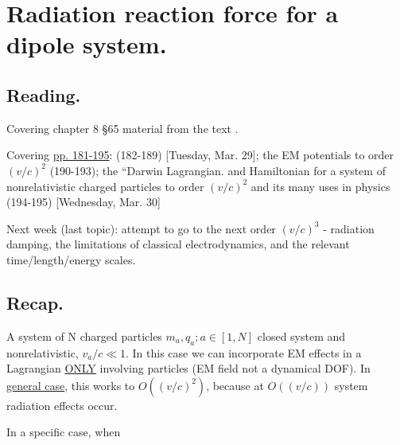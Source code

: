 %
%

\chapter{Radiation reaction force for a dipole system.}
\label{chap:relativisticElectrodynamicsL26}
{}
\date{April 5, 2011}

\beginArtNoToc

\section{Reading.}

Covering chapter 8 \S 65 material from the text \citep{landau1980classical}.

Covering \href{http://www.physics.utoronto.ca/~poppitz/epoppitz/PHY450_files/RelEMpp181-195.pdf}{pp. 181-195}: (182-189) [Tuesday, Mar. 29]; the EM potentials to order $(v/c)^2$ (190-193); the ``Darwin Lagrangian.  and Hamiltonian for a system of nonrelativistic charged particles to order $(v/c)^2$ and its many uses in physics (194-195) [Wednesday, Mar. 30]

Next week (last topic): attempt to go to the next order $(v/c)^3$ - radiation damping, the limitations of classical electrodynamics, and the relevant time/length/energy scales.

\section{Recap.}

A system of N charged particles $m_a, q_a ; a \in [1, N]$ closed system and nonrelativistic, $v_a/c \ll 1$.  In this case we can incorporate EM effects in a Lagrangian \underline{ONLY} involving particles (EM field not a dynamical DOF).  In \underline{general case}, this works to $O((v/c)^2)$, because at $O((v/c))$ system radiation effects occur.

In a specific case, when
 
